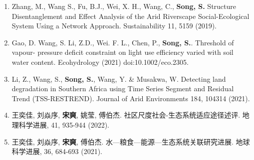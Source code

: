 \begin{paper}
\begin{enumerate}
	\item Zhang, M., Wang S., Fu, B.J., Wei, X. H., Wang, C., \textbf{Song, S.} Structure Disentanglement and Effect Analysis of the Arid Riverscape Social-Ecological System Using a Network Approach. Sustainability 11, 5159 (2019). %
	\item Gao, D. Wang, S. Li, Z.D., Wei. F. L., Chen, P., \textbf{Song, S.}. Threshold of vapour- pressure deficit constraint on light use efficiency varied with soil water content. Ecohydrology (2021) doi:10.1002/eco.2305. %
	\item Li, Z., Wang, S., \textbf{Song, S.}, Wang, Y. \& Musakwa, W. Detecting land degradation in Southern Africa using Time Series Segment and Residual Trend (TSS-RESTREND). Journal of Arid Environments 184, 104314 (2021). %
	\item 王奕佳, 刘焱序, \textbf{宋爽}, 姚莹, 傅伯杰. 社区尺度社会-生态系统适应途径述评. 地理科学进展, 41, 935-944 (2022). %
	\item 王奕佳, 刘焱序, \textbf{宋爽}, 傅伯杰. 水—粮食—能源—生态系统关联研究进展. 地球科学进展, 36, 684-693 (2021). %
	
\end{enumerate}
\end{paper}
